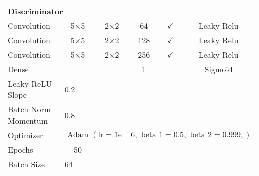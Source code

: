 \begin{longtable}[c]{@{}lccccc@{}}
	\multicolumn{6}{l}{\textbf{Discriminator}} \\
	Convolution & \multicolumn{1}{c}{5$\times$5} & 2$\times$2 & 64 & $\checkmark$ & Leaky Relu \\
	Convolution & \multicolumn{1}{c}{5$\times$5} & 2$\times$2 & 128 & $\checkmark$ & Leaky Relu \\
	Convolution & \multicolumn{1}{c}{5$\times$5} & 2$\times$2 & 256 & $\checkmark$ & Leaky Relu \\
	Dense & \multicolumn{1}{c}{} &  & 1 &  & Sigmoid \\ \hline
	Leaky ReLU Slope & \multicolumn{5}{l}{0.2} \\
	Batch Norm Momentum & \multicolumn{5}{l}{0.8} \\
	Optimizer & \multicolumn{5}{l}{$\text { Adam }(\mathrm{lr}=1 \mathrm{e}-6, \text { beta } 1=0.5, \text { beta } 2=0.999,)$} \\ \hline
	Epochs & 50 & \multicolumn{1}{l}{} & \multicolumn{1}{l}{} & \multicolumn{1}{l}{} & \multicolumn{1}{l}{} \\
	Batch Size & \multicolumn{5}{l}{64}
\end{longtable}


